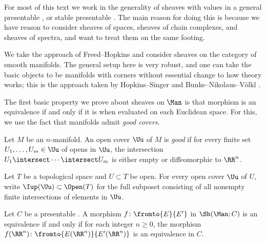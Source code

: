 \noindent For most of this text we work in the generality of sheaves with values in a general presentable \category, or stable presentable \category. 
The main reason for doing this is because we have reason to consider sheaves of spaces, sheaves of chain complexes, and sheaves of spectra, and want to treat them on the same footing.

\begin{remark}
	We take the approach of Freed--Hopkins \cite{MR3049871} and consider sheaves on the category of smooth manifolds.
	The general setup here is very robust, and one can take the basic objects to be manifolds with corners without
	essential change to how theory works; this is the approach taken by Hopkins--Singer \cite{MR2192936} and
	Bunke--Nikolaus--Völkl \cite{MR3462099}.
\end{remark}

The first basic property we prove about sheaves on $ \Man $ is that morphism is an equivalence if and only if it is when evaluated on each Euclidean space.
For this, we use the fact that manifolds admit \textit{good covers}.

\begin{recollection}
	Let $ M $ be an $ n $-manifold.
	An open cover $ \Uu $ of $ M $ is \textit{good} if for every finite set $ U_1,\ldots,U_m \in \Uu $ of opens in $ \Uu $, the intersection $ U_1 \intersect \cdots \intersect U_m $ is either empty or diffeomorphic to $ \RR^n $.
\end{recollection}

\begin{notation}
	Let $ T $ be a topological space and $ U \subset T $ be open.
	For every open cover $ \Uu $ of $ U $, write $ \Iup(\Uu) \subset \Open(T) $ for the full subposet  consisting of all nonempty finite intersections of elements in $ \Uu $.
\end{notation}

\begin{lemma}\label{lem:checkequivonRn}
	Let $ C $ be a presentable \category.
	A morphism $ f \colon \fromto{E}{E'} $ in $ \Sh(\Man;C) $ is an equivalence if and only if for each integer $ n \geq 0 $, the morphism $ f(\RR^n) \colon \fromto{E(\RR^n)}{E'(\RR^n)} $ is an equivalence in $ C $.
\end{lemma}

